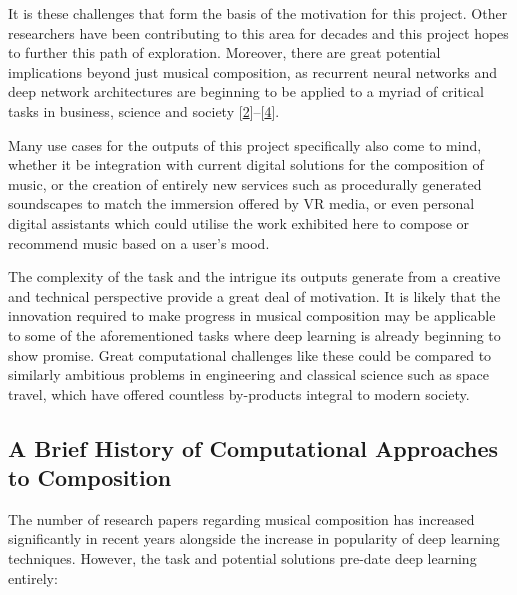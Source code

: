 \documentclass[12pt,]{article}
\begin{document}
It is these challenges that form the basis of the motivation for this
project. Other researchers have been contributing to this area for
decades and this project hopes to further this path of exploration.
Moreover, there are great potential implications beyond just musical
composition, as recurrent neural networks and deep network architectures
are beginning to be applied to a myriad of critical tasks in business,
science and society
{[}\protect\hyperlink{ref-deng2014deep}{2}{]}--{[}\protect\hyperlink{ref-goodfellow2016deep}{4}{]}.

Many use cases for the outputs of this project specifically also come to
mind, whether it be integration with current digital solutions for the
composition of music, or the creation of entirely new services such as
procedurally generated soundscapes to match the immersion offered by VR
media, or even personal digital assistants which could utilise the work
exhibited here to compose or recommend music based on a user's mood.

The complexity of the task and the intrigue its outputs generate from a
creative and technical perspective provide a great deal of motivation.
It is likely that the innovation required to make progress in musical
composition may be applicable to some of the aforementioned tasks where
deep learning is already beginning to show promise. Great computational
challenges like these could be compared to similarly ambitious problems
in engineering and classical science such as space travel, which have
offered countless by-products integral to modern society.

\hypertarget{a-brief-history-of-computational-approaches-to-composition}{%
\subsection{A Brief History of Computational Approaches to
Composition}\label{a-brief-history-of-computational-approaches-to-composition}}

The number of research papers regarding musical composition has
increased significantly in recent years alongside the increase in
popularity of deep learning techniques. However, the task and potential
solutions pre-date deep learning entirely:
\end{document}
